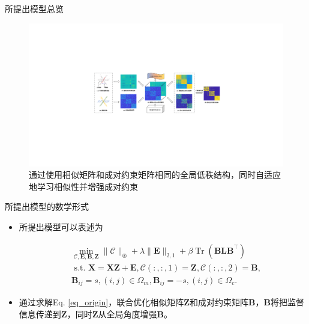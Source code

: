 \documentclass{beamer}
\begin{document}
\begin{frame}{所提出模型总览}

    \begin{figure}[htpb]
        \centering
        \includegraphics[width=1\linewidth]{pic/1.pdf}
        \caption{通过使用相似矩阵和成对约束矩阵相同的全局低秩结构，同时自适应地学习相似性并增强成对约束}
    \end{figure}

\end{frame}

\begin{frame}{所提出模型的数学形式}

    \begin{itemize}
            \item 所提出模型可以表述为
        
	\begin{equation}
		\begin{aligned}
			&\min _{\mathcal{C}, \mathbf{E}, \mathbf{B}, \mathbf{Z} }\|\mathcal{C}\|_{\circledast}+\lambda\|\mathbf{E}\|_{2,1}+\beta\operatorname{Tr}(\mathbf{B L B}^{\top}) \\
			&\text { s.t. } \mathbf{X}=\mathbf{X Z}+\mathbf{E}, \mathcal{C}(:,:,1)=\mathbf{Z}, \mathcal{C}(:,:,2)=\mathbf{B},  \\
			&\mathbf{B}_{i j}=s,(i, j) \in \Omega_{m}, \mathbf{B}_{i j}=-s,(i, j) \in \Omega_{c}.
		\end{aligned}
		\label{eq_origin}
	\end{equation}

            \vspace{0.2cm}
            \item 通过求解Eq. \eqref{eq_origin}，联合优化相似矩阵$\mathbf{Z}$和成对约束矩阵$\mathbf{B}$，$\mathbf{B}$将把监督信息传递到$\mathbf{Z}$，同时$\mathbf{Z}$从全局角度增强$\mathbf{B}$。
    \end{itemize}
\end{frame}
\end{document}
